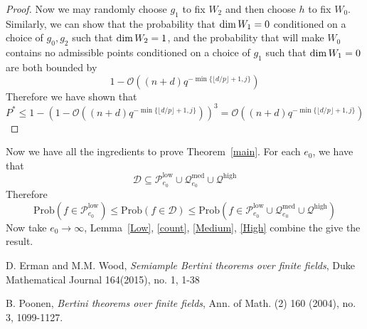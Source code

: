 \documentclass[12pt]{article}
\theoremstyle{plain}
\theoremstyle{definition}
\newcommand{\sD}{\mathcal{D}}
\newcommand{\sO}{\mathcal{O}}
\newcommand{\sP}{\mathcal{P}}
\newcommand{\sQ}{\mathcal{Q}}
\renewcommand\dim{{\rm dim\,}}
\newcommand{\<}{\langle}
\renewcommand{\>}{\rangle}
\newcommand{\Prob}{\mathrm{Prob}}
\begin{document}
\begin{proof}
Now we may randomly choose $g_1$ to fix $W_2$ and then choose $h$ to fix $W_0$. Similarly, we can show that the probability that $\dim W_1 = 0$ conditioned on a choice of $g_0, g_2$ such that $\dim W_2 = 1$, and the probability that will make $W_0$ contains no admissible points conditioned on a choice of $g_1$ such that $\dim W_1 = 0$ are both bounded by $$1 - \sO((n + d)q^{- \min\{ \lfloor d/p \rfloor + 1, j\}})$$
Therefore we have shown that 
$$ P^* \le 1 - (1 - \sO((n + d)q^{- \min\{ \lfloor d/p \rfloor + 1, j\}}))^3 = \sO((n + d)q^{- \min\{ \lfloor d/p \rfloor + 1, j\}}) $$  

\end{proof}

Now we have all the ingredients to prove Theorem~\ref{main}. For each $e_0$, we have that 
$$ \sD \subseteq \sP_{e_0}^{\mathrm{low}} \cup \sQ_{e_0}^{\mathrm{med}} \cup \sQ^{\mathrm{high}}$$
Therefore 
$$ \Prob(f \in \sP_{e_0}^{\mathrm{low}}) \le \Prob(f \in \sD) \le \Prob(f \in \sP_{e_0}^{\mathrm{low}} \cup \sQ_{e_0}^{\mathrm{med}} \cup \sQ^{\mathrm{high}})$$
Now take $e_0 \to \infty$, Lemma~\ref{Low}, \ref{count}, \ref{Medium}, \ref{High} combine the give the result. 

\begin{thebibliography}{9} 
D. Erman and M.M. Wood, \textit{Semiample Bertini theorems over finite fields}, Duke Mathematical Journal 164(2015), no. 1, 1-38

B. Poonen, \textit{Bertini theorems over finite fields}, Ann. of Math. (2) 160 (2004), no. 3, 1099-1127.
\end{thebibliography}
\end{document}

